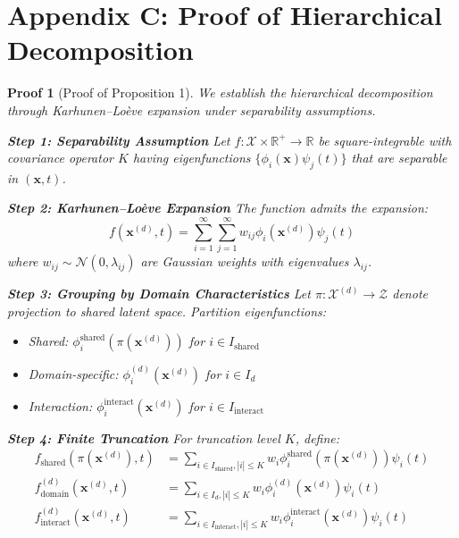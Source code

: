 \documentclass[12pt]{article}
\newcommand{\N}{\mathcal{N}}
\newtheorem{proof_sketch}{Proof}
\begin{document}
\section{Appendix C: Proof of Hierarchical Decomposition}

\begin{proof_sketch}[Proof of Proposition 1]
We establish the hierarchical decomposition through Karhunen–Loève expansion under separability assumptions.

\textbf{Step 1: Separability Assumption}
Let $f:\mathcal{X}\times\mathbb{R}^+\!\to\mathbb{R}$ be square-integrable with covariance operator $K$ having eigenfunctions $\{\phi_i(\mathbf{x})\psi_j(t)\}$ that are separable in $(\mathbf{x},t)$.

\textbf{Step 2: Karhunen–Loève Expansion}
The function admits the expansion:
\begin{equation}
f(\mathbf{x}^{(d)}, t) = \sum_{i=1}^{\infty}\sum_{j=1}^{\infty} w_{ij} \phi_i(\mathbf{x}^{(d)}) \psi_j(t)
\end{equation}
where $w_{ij} \sim \N(0, \lambda_{ij})$ are Gaussian weights with eigenvalues $\lambda_{ij}$.

\textbf{Step 3: Grouping by Domain Characteristics}
Let $\pi:\mathcal{X}^{(d)}\!\to\mathcal{Z}$ denote projection to shared latent space. Partition eigenfunctions:
\begin{itemize}
\item Shared: $\phi_i^{\text{shared}}(\pi(\mathbf{x}^{(d)}))$ for $i \in I_{\text{shared}}$
\item Domain-specific: $\phi_i^{(d)}(\mathbf{x}^{(d)})$ for $i \in I_d$
\item Interaction: $\phi_i^{\text{interact}}(\mathbf{x}^{(d)})$ for $i \in I_{\text{interact}}$
\end{itemize}

\textbf{Step 4: Finite Truncation}
For truncation level $K$, define:
\begin{align}
f_{\text{shared}}(\pi(\mathbf{x}^{(d)}), t) &= \sum_{i \in I_{\text{shared}}, |i| \leq K} w_i \phi_i^{\text{shared}}(\pi(\mathbf{x}^{(d)})) \psi_i(t)\\
f_{\text{domain}}^{(d)}(\mathbf{x}^{(d)}, t) &= \sum_{i \in I_d, |i| \leq K} w_i \phi_i^{(d)}(\mathbf{x}^{(d)}) \psi_i(t)\\
f_{\text{interact}}^{(d)}(\mathbf{x}^{(d)}, t) &= \sum_{i \in I_{\text{interact}}, |i| \leq K} w_i \phi_i^{\text{interact}}(\mathbf{x}^{(d)}) \psi_i(t)
\end{align}


\end{proof_sketch}
\end{document}

